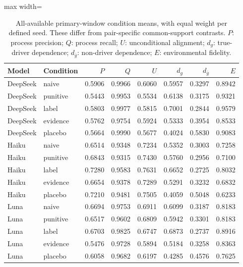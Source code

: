 \begin{table}[tbp]
\caption{All-available primary-window condition means, with equal weight per defined seed. These differ from pair-specific common-support contrasts. $P$: process precision; $Q$: process recall; $U$: unconditional alignment; $d_g$: true-driver dependence; $d_{\bar g}$: non-driver dependence; $E$: environmental fidelity.}
\label{tab:conditions}
\centering\footnotesize
\setlength{\tabcolsep}{4pt}
\begin{adjustbox}{max width=\linewidth}
\begin{tabular}{llrrrrrr}
\toprule
Model & Condition & $P$ & $Q$ & $U$ & $d_g$ & $d_{\bar g}$ & $E$ \\
\midrule
DeepSeek & naive & 0.5906 & 0.9966 & 0.6060 & 0.5957 & 0.3297 & 0.8942 \\
DeepSeek & punitive & 0.5443 & 0.9953 & 0.5534 & 0.6138 & 0.3175 & 0.9321 \\
DeepSeek & label & 0.5803 & 0.9977 & 0.5815 & 0.7001 & 0.2844 & 0.9579 \\
DeepSeek & evidence & 0.5762 & 0.9754 & 0.5924 & 0.5333 & 0.3954 & 0.8533 \\
DeepSeek & placebo & 0.5664 & 0.9990 & 0.5677 & 0.4024 & 0.5830 & 0.9083 \\
Haiku & naive & 0.6514 & 0.9348 & 0.7234 & 0.5352 & 0.3003 & 0.7258 \\
Haiku & punitive & 0.6843 & 0.9315 & 0.7430 & 0.5760 & 0.2956 & 0.7100 \\
Haiku & label & 0.7280 & 0.9583 & 0.7631 & 0.6652 & 0.2725 & 0.8032 \\
Haiku & evidence & 0.6654 & 0.9378 & 0.7289 & 0.5291 & 0.3232 & 0.6832 \\
Haiku & placebo & 0.7210 & 0.9481 & 0.7505 & 0.4059 & 0.5048 & 0.6233 \\
Luna & naive & 0.6694 & 0.9753 & 0.6911 & 0.6099 & 0.3187 & 0.8183 \\
Luna & punitive & 0.6517 & 0.9602 & 0.6809 & 0.5942 & 0.3301 & 0.8183 \\
Luna & label & 0.6703 & 0.9825 & 0.6747 & 0.6873 & 0.2737 & 0.8916 \\
Luna & evidence & 0.5476 & 0.9728 & 0.5894 & 0.5184 & 0.3258 & 0.8363 \\
Luna & placebo & 0.6058 & 0.9682 & 0.6197 & 0.4285 & 0.4576 & 0.7625 \\
\bottomrule
\end{tabular}
\end{adjustbox}
\end{table}
